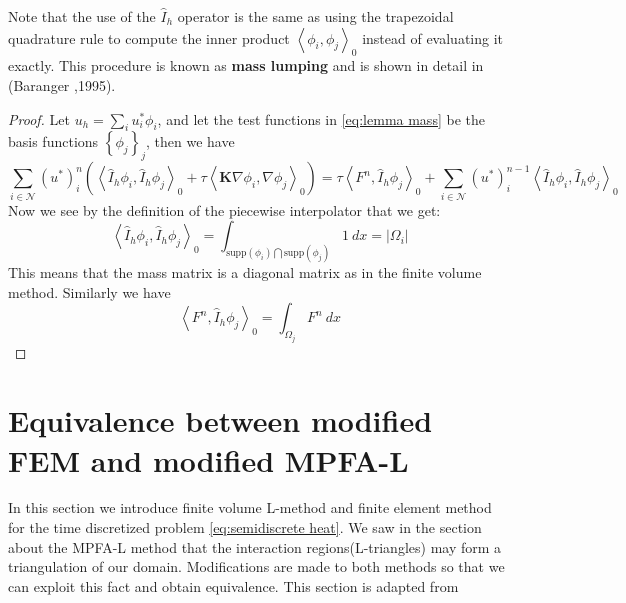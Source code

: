 \documentclass[../Main/main.tex]{subfiles}
\begin{document}
	\begin{remark}
		Note that the use of the $\hat{I}_h$ operator is the same as using the trapezoidal quadrature rule to compute the inner product $\left \langle \phi_i,\phi_j \right \rangle_0$ instead of evaluating it exactly.
		This procedure is known as \textbf{mass lumping} and is shown in detail in (Baranger \cite{baranger1996connection},1995).
	\end{remark}
	\begin{proof}
		Let $u_h = \sum_i u_i^* \phi_i$, and let the test functions in \eqref{eq:lemma mass} be the basis functions $\left \{ \phi_j \right \}_j$, then we have 
		\begin{equation}
		\sum_{i\in \mathcal{N}} (u^*)^n_i (\left \langle \hat{I}_h\phi_i,\hat{I}_h\phi_j\right \rangle_0 +\tau \left \langle  \pmb{K} \nabla \phi_i, \nabla \phi_j \right \rangle_0) = \tau \left \langle F^n,\hat{I}_h \phi_j \right \rangle_0 + \sum_{i\in \mathcal{N}} (u^*)^{n-1}_i \left \langle \hat{I}_h \phi_i,\hat{I}_h \phi_j \right \rangle_0
		\end{equation}
		Now we see by the definition of the piecewise interpolator that we get:
		\begin{equation}
			\left \langle \hat{I}_h\phi_i,\hat{I}_h\phi_j\right \rangle_0 = \int_{\text{supp}(\phi_i)\bigcap\text{supp}(\phi_j)} 1 \ dx = |\Omega_i|
		\end{equation}
		This means that the mass matrix is a diagonal matrix as in the finite volume method. Similarly we have 
		\begin{equation}
			\left \langle F^n,\hat{I}_h \phi_j \right \rangle_0 = \int_{\Omega_j}F^n \ dx
		\end{equation}
	\end{proof}
	\section*{Equivalence between modified FEM and modified MPFA-L}	
	In this section we introduce finite volume L-method and finite element method for the time discretized problem \eqref{eq:semidiscrete heat}. 
	We saw in the section about the MPFA-L method that the interaction regions(L-triangles) may form a triangulation of our domain.
	Modifications are made to both methods so that we can exploit this fact and obtain equivalence. This section is adapted from 
\end{document}
